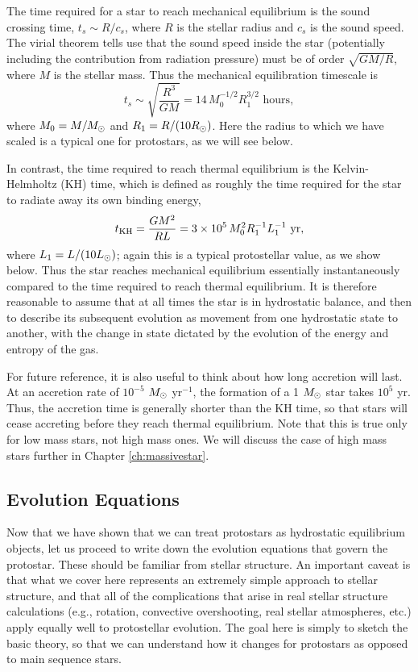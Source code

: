 The time required for a star to reach mechanical equilibrium is the sound crossing time, $t_s\sim R/c_s$, where $R$ is the stellar radius and $c_s$ is the sound speed. The virial theorem tells use that the sound speed inside the star (potentially including the contribution from radiation pressure) must be of order $\sqrt{GM/R}$, where $M$ is the stellar mass. Thus the mechanical equilibration timescale is
\begin{equation}
t_s \sim \sqrt{\frac{R^3}{GM}} = 14\, M_0^{-1/2} R_1^{3/2}\mbox{ hours},
\end{equation}
where $M_0 = M / M_{\odot}$ and $R_{1} = R/(10R_{\odot})$. Here the radius to which we have scaled is a typical one for protostars, as we will see below.

In contrast, the time required to reach thermal equilibrium is the Kelvin-Helmholtz (KH) time, which is defined as roughly the time required for the star to radiate away its own binding energy,
\begin{equation}
t_{\rm KH} = \frac{GM^2}{RL} = 3\times 10^5\, M_0^2 R_1^{-1} L_1^{-1}\mbox{ yr},
\end{equation}
where $L_1 = L/(10 L_{\odot})$; again this is a typical protostellar value, as we show below. Thus the star reaches mechanical equilibrium essentially instantaneously compared to the time required to reach thermal equilibrium. It is therefore reasonable to assume that at all times the star is in hydrostatic balance, and then to describe its subsequent evolution as movement from one hydrostatic state to another, with the change in state dictated by the evolution of the energy and entropy of the gas. 

For future reference, it is also useful to think about how long accretion will last. At an accretion rate of $10^{-5}$ $M_{\odot}$ yr$^{-1}$, the formation of a 1 $M_{\odot}$ star takes $10^5$ yr. Thus, the accretion time is generally shorter than the KH time, so that stars will cease accreting before they reach thermal equilibrium. Note that this is true only for low mass stars, not high mass ones. We will discuss the case of high mass stars further in Chapter \ref{ch:massivestar}.

\subsection{Evolution Equations}

Now that we have shown that we can treat protostars as hydrostatic equilibrium objects, let us proceed to write down the evolution equations that govern the protostar. These should be familiar from stellar structure. An important caveat is that what we cover here represents an extremely simple approach to stellar structure, and that all of the complications that arise in real stellar structure calculations (e.g., rotation, convective overshooting, real stellar atmospheres, etc.) apply equally well to protostellar evolution. The goal here is simply to sketch the basic theory, so that we can understand how it changes for protostars as opposed to main sequence stars.

